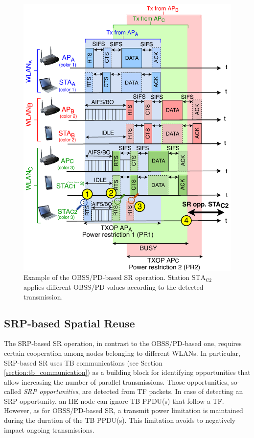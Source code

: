 \documentclass[comsoc]{IEEEtran}
\begin{document}
	\begin{figure}[ht!]
		\centering
		\includegraphics[width=\columnwidth]{fig_12}
		\caption{Example of the OBSS/PD-based SR operation. Station $\text{STA}_\text{C2}$ applies different OBSS/PD values according to the detected transmission.}
		\label{fig:fig_12}
	\end{figure}
	
	\subsection{SRP-based Spatial Reuse}
	\label{section:srp_based}	
	The SRP-based SR operation, in contrast to the OBSS/PD-based one, requires certain cooperation among nodes belonging to different WLANs. In particular, SRP-based SR uses TB communications (see Section \ref{section:tb_communication}) as a building block for identifying opportunities that allow increasing the number of parallel transmissions. Those opportunities, so-called \emph{SRP opportunities}, are detected from TF packets. In case of detecting an SRP opportunity, an HE node can ignore TB PPDU(s) that follow a TF. However, as for OBSS/PD-based SR, a transmit power limitation is maintained during the duration of the TB PPDU(s). This limitation avoids to negatively impact ongoing transmissions.
	
\end{document}
